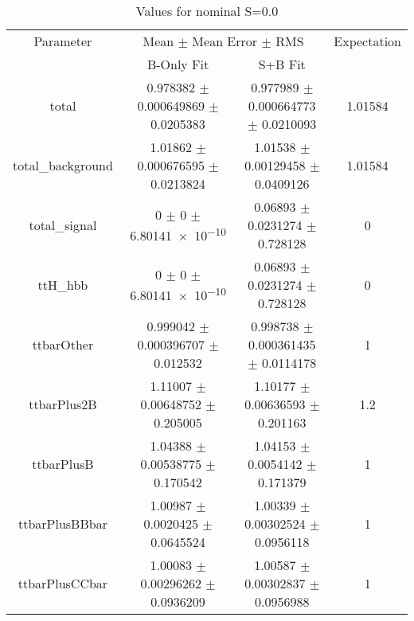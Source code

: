 \begin{table}
\centering
\caption{Values for nominal S=0.0}
\begin{tabular}{cccc}
\toprule
Parameter & \multicolumn{2}{c}{Mean $\pm$ Mean Error $\pm$ RMS} & Expectation\\
 & B-Only Fit & S+B Fit & \\
\midrule
total & \num{0.978382} $\pm$ \num{0.000649869} $\pm$ \num{0.0205383} & \num{0.977989} $\pm$ \num{0.000664773} $\pm$ \num{0.0210093} & \num{1.01584}\\
total\_background & \num{1.01862} $\pm$ \num{0.000676595} $\pm$ \num{0.0213824} & \num{1.01538} $\pm$ \num{0.00129458} $\pm$ \num{0.0409126} & \num{1.01584}\\
total\_signal & \num{0} $\pm$ \num{0} $\pm$ \num{6.80141e-10} & \num{0.06893} $\pm$ \num{0.0231274} $\pm$ \num{0.728128} & \num{0}\\
ttH\_hbb & \num{0} $\pm$ \num{0} $\pm$ \num{6.80141e-10} & \num{0.06893} $\pm$ \num{0.0231274} $\pm$ \num{0.728128} & \num{0}\\
ttbarOther & \num{0.999042} $\pm$ \num{0.000396707} $\pm$ \num{0.012532} & \num{0.998738} $\pm$ \num{0.000361435} $\pm$ \num{0.0114178} & \num{1}\\
ttbarPlus2B & \num{1.11007} $\pm$ \num{0.00648752} $\pm$ \num{0.205005} & \num{1.10177} $\pm$ \num{0.00636593} $\pm$ \num{0.201163} & \num{1.2}\\
ttbarPlusB & \num{1.04388} $\pm$ \num{0.00538775} $\pm$ \num{0.170542} & \num{1.04153} $\pm$ \num{0.0054142} $\pm$ \num{0.171379} & \num{1}\\
ttbarPlusBBbar & \num{1.00987} $\pm$ \num{0.0020425} $\pm$ \num{0.0645524} & \num{1.00339} $\pm$ \num{0.00302524} $\pm$ \num{0.0956118} & \num{1}\\
ttbarPlusCCbar & \num{1.00083} $\pm$ \num{0.00296262} $\pm$ \num{0.0936209} & \num{1.00587} $\pm$ \num{0.00302837} $\pm$ \num{0.0956988} & \num{1}\\
\bottomrule
\end{tabular}
\end{table}